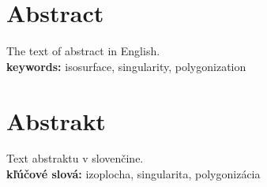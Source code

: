 \newpage


\section*{Abstract}
The text of abstract in English. \\

\noindent \textbf{keywords:} isosurface, singularity, polygonization

\newpage

\section*{Abstrakt}
Text abstraktu v slovenčine. \\

\noindent \textbf{kľúčové slová:} izoplocha, singularita, polygonizácia

\newpage



\tableofcontents


\listoffigures


\listoftables
 
\lstlistoflistings
